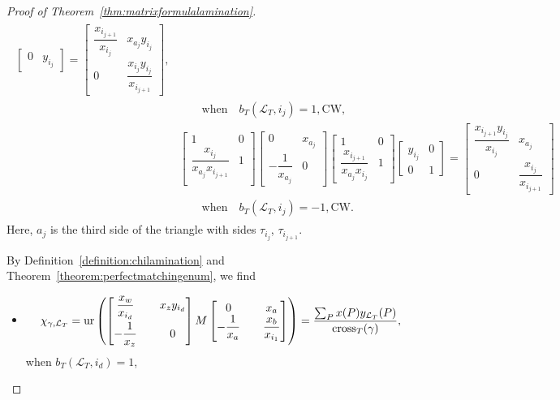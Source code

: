 \documentclass[10pt,a4paper]{amsart}
\numberwithin{equation}{section}
\theoremstyle{definition}
\begin{document}
\begin{proof}[Proof of Theorem~\ref{thm:matrixformulalamination}]
{\begin{gather*}
\begin{split}
\begin{bmatrix}
 0 & y_{i_j}
 \end{bmatrix}=
 \begin{bmatrix}
 \dfrac{x_{i_{j+1}}}{x_{i_j}} & x_{a_j}y_{i_j}\\
 0 & \dfrac{x_{i_j}y_{i_j}}{x_{i_{j+1}}}
 \end{bmatrix}, \\
 &\qquad \text{when}\quad b_T(\mathcal{L}_T, i_j)=1, \text{CW},\\
& \begin{bmatrix}
 1 & 0\\
 \dfrac{x_{i_j}}{x_{a_j}x_{i_{j+1}}} & 1\\
 \end{bmatrix}
 \begin{bmatrix}
 0 & x_{a_j}\\
 -\dfrac{1}{x_{a_j}} & 0
 \end{bmatrix}
 \begin{bmatrix}
 1 & 0\\
 \dfrac{x_{i_{j+1}}}{x_{a_j}x_{i_j}} & 1
 \end{bmatrix}
 \begin{bmatrix}
 y_{i_j} & 0\\
 0 & 1
 \end{bmatrix}=
 \begin{bmatrix}
 \dfrac{x_{i_{j+1}}y_{i_j}}{x_{i_j}} & x_{a_j}\\
 0 & \dfrac{x_{i_j}}{x_{i_{j+1}}}
 \end{bmatrix} \\
& \qquad\text{when}\quad b_T(\mathcal{L}_T, i_j)=-1, \text{CW}.
\end{split}
\end{gather*}
Here, $a_j$ is the third side of the triangle with sides $\tau_{i_j}$, $\tau_{i_{j+1}}$.}

By Definition~\ref{definition:chilamination} and Theorem~\ref{theorem:perfectmatchingenum}, we find
 \begin{itemize}\itemsep=0pt
 \item {\samepage\[
 \chi_{\gamma, \mathcal{L}_{T}}=\operatorname{ur}\left(\begin{bmatrix}
\dfrac{x_w}{x_{i_d}} && x_{z}y_{i_d}\vspace{1mm}\\
-\dfrac{1}{x_{z}} && 0
\end{bmatrix}
M
\begin{bmatrix}
0 && x_a\\
-\dfrac{1}{x_a} && \dfrac{x_b}{x_{i_1}}
\end{bmatrix}\right)=\frac{\sum_P x(P)y_{\mathcal{L}_T}(P)}{\operatorname{cross}_T(\gamma)},\]
when $ b_{T}(\mathcal{L}_{T}, i_{d})=1$,}


\end{itemize}
\end{proof}
\end{document}

